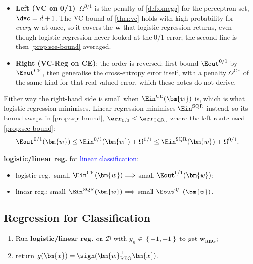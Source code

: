 \begin{itemize}
    \item \textbf{Left (VC on 0/1)}: \(\Omega^{0/1}\) is the penalty of
        \autoref{def:omega} for the perceptron set, \(\dvc = d + 1\). The VC
        bound of \autoref{thm:vc} holds with high probability for \emph{every}
        \(\bm{w}\) at once, so it covers the \(\bm{w}\) that logistic regression
        returns, even though logistic regression never looked at the 0/1 error;
        the second line is then \autoref{prop:sce-bound} averaged.
    \item \textbf{Right (VC-Reg on CE)}: the order is reversed: first bound
        \(\Eout^{0/1}\) by \(\Eout^{\mathrm{CE}}\), then generalise the
        cross-entropy error itself, with a penalty \(\Omega^{\mathrm{CE}}\) of
        the same kind for that real-valued error, which these notes do not
        derive.
\end{itemize}
Either way the right-hand side is small when \(\Ein^{\mathrm{CE}}(\bm{w})\) is,
which is what logistic regression minimises. Linear regression minimises
\(\Ein^{\mathrm{SQR}}\) instead, so its bound swaps in
\autoref{prop:sqr-bound}, \(\err_{0/1} \le \err_{\mathrm{SQR}}\), where the
left route used \autoref{prop:sce-bound}:
\[
    \Eout^{0/1}(\bm{w}) \le \Ein^{0/1}(\bm{w}) + \Omega^{0/1}
    \le \Ein^{\mathrm{SQR}}(\bm{w}) + \Omega^{0/1} .
\]

\begin{moral}
    \textbf{logistic/linear reg.} for \textcolor{blue}{linear classification}:
    \begin{itemize}
        \item logistic reg.: small \(\Ein^{\mathrm{CE}}(\bm{w})
            \Longrightarrow\) small \(\Eout^{0/1}(\bm{w})\);
        \item linear reg.: small \(\Ein^{\mathrm{SQR}}(\bm{w})
            \Longrightarrow\) small \(\Eout^{0/1}(\bm{w})\).
    \end{itemize}
\end{moral}

\subsection{Regression for Classification}

\begin{enumerate}
    \item Run \textbf{logistic/linear reg.} on \(\mathcal{D}\) with \(y_n \in
        \left\{ -1, +1 \right\}\) to get \(\bm{w}_{\mathrm{REG}}\);
    \item return \(g(\bm{x}) = \sign(\bm{w}_{\mathrm{REG}}^\top \bm{x})\).
\end{enumerate}

